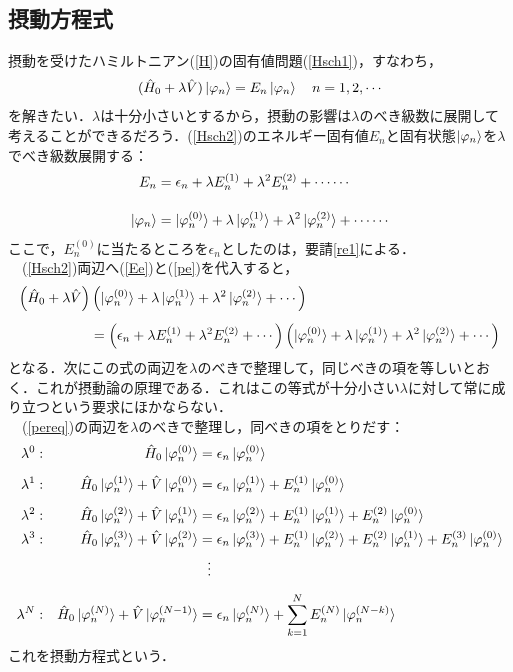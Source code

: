%
\subsection{摂動方程式}
摂動を受けたハミルトニアン(\ref{H})の固有値問題(\ref{Hsch1})，すなわち，
\begin{align}\label{Hsch2}
(\hat{H}_0+\lambda\hat{V})\ket{\varphi_n}=E_n\ket{\varphi_n}\ \ \ n=1,2,\cdots
\end{align}
を解きたい．$\lambda$は十分小さいとするから，摂動の影響は$\lambda$のべき級数に展開して考えることができるだろう．(\ref{Hsch2})のエネルギー固有値$E_n$と固有状態$\ket{\varphi_n}$を$\lambda$でべき級数展開する：
\begin{align}
\label{Ee}
E_n&=\epsilon_n+\lambda E^{(1)}_n+\lambda^2E^{(2)}_n+\cdots\cdots\\[10pt]
\label{pe}
\ket{\varphi_n}&=\ket{\varphi^{(0)}_n}+\lambda \ket{\varphi^{(1)}_n}+\lambda^2\ket{\varphi^{(2)}_n}+\cdots\cdots
\end{align}
ここで，$E^{(0)}_n$に当たるところを$\epsilon_n$としたのは，要請\ref{re1}による．\\
　(\ref{Hsch2})両辺へ(\ref{Ee})と(\ref{pe})を代入すると，
\begin{align}\label{pereq}
\left(\hat{H}_0+\lambda\hat{V}\right)&
\left
(\ket{\varphi^{(0)}_n}+\lambda \ket{\varphi^{(1)}_n}+\lambda^2\ket{\varphi^{(2)}_n}+\cdots\right)\notag\\[5pt]
&=\left(\epsilon_n+\lambda E^{(1)}_n+\lambda^2E^{(2)}_n+\cdots\right)
\left(\ket{\varphi^{(0)}_n}+\lambda \ket{\varphi^{(1)}_n}+\lambda^2\ket{\varphi^{(2)}_n}+\cdots\right)
\end{align}
となる．次にこの式の両辺を$\lambda$のべきで整理して，同じべきの項を等しいとおく．これが摂動論の原理である．これはこの等式が十分小さい$\lambda$に対して常に成り立つという要求にほかならない．\\
　(\ref{pereq})の両辺を$\lambda$のべきで整理し，同べきの項をとりだす：
　\begin{align}
\label{pereq0}
\lambda^0&:&\hat{H}_0\ket{\varphi^{(0)}_n}&=\epsilon_n\ket{\varphi^{(0)}_n}\\[5pt]
%
\label{pereq1}
\lambda^1&:&\hat{H}_0\ket{\varphi^{(1)}_n}+\hat{V}\ket{\varphi^{(0)}_n}
&=\epsilon_n\ket{\varphi^{(1)}_n}+E^{(1)}_n\ket{\varphi^{(0)}_n}\\[5pt]
%
\label{pereq2}
\lambda^2&:&\hat{H}_0\ket{\varphi^{(2)}_n}+\hat{V}\ket{\varphi^{(1)}_n}
&=\epsilon_n\ket{\varphi^{(2)}_n}+E^{(1)}_n\ket{\varphi^{(1)}_n}+E^{(2)}_n\ket{\varphi^{(0)}_n}\\
%
\label{pereq3}
\lambda^3&:&\hat{H}_0\ket{\varphi^{(3)}_n}+\hat{V}\ket{\varphi^{(2)}_n}
&=\epsilon_n\ket{\varphi^{(3)}_n}+E^{(1)}_n\ket{\varphi^{(2)}_n}+E^{(2)}_n\ket{\varphi^{(1)}_n}
+E^{(3)}_n\ket{\varphi^{(0)}_n}\\
& & &\ \ \vdots\nn[5pt]
%
\label{pereqN}
\lambda^N&:&\hat{H}_0\ket{\varphi^{(N)}_n}+\hat{V}\ket{\varphi^{(N-1)}_n}
&=\epsilon_n\ket{\varphi^{(N)}_n}+\sum_{k=1}^{N}E^{(N)}_n\ket{\varphi^{(N-k)}_n}
\end{align}
これを摂動方程式という．




